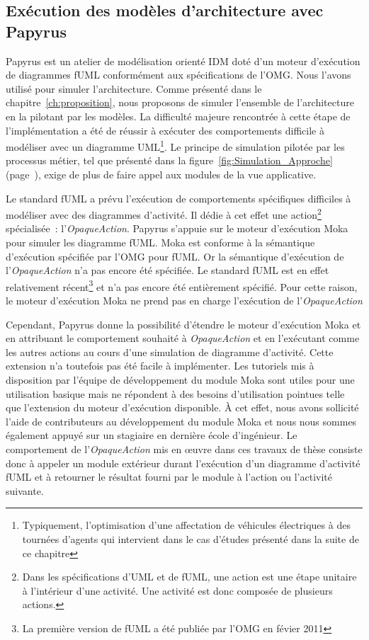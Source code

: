     \subsection{Exécution des modèles d’architecture avec Papyrus}
    \label{sec:opaque_action_papyrus}

    Papyrus est un atelier de modélisation orienté IDM doté d'un moteur
    d'exécution de diagrammes fUML conformément aux spécifications de l'OMG.
    Nous l'avons utilisé pour simuler l'architecture. Comme présenté dans le
    chapitre~\ref{ch:proposition}, nous proposons de simuler l'ensemble de
    l'architecture en la pilotant par les modèles.  La difficulté majeure
    rencontrée à cette étape de l'implémentation a été de réussir à exécuter des
    comportements difficile à modéliser avec un diagramme
    UML\footnote{Typiquement, l'optimisation d'une affectation de véhicules
    électriques à des tournées d'agents qui intervient dans le cas d'études
    présenté dans la suite de ce chapitre}. Le principe de simulation pilotée
    par les processus métier, tel que présenté dans la
    figure~\ref{fig:Simulation_Approche}
    (page~\pageref{fig:Simulation_Approche}), exige de plus de faire appel aux
    modules de la vue applicative.
    
    Le standard fUML a prévu l'exécution de comportements spécifiques difficiles
    à modéliser avec  des diagrammes d'activité. Il dédie à cet effet une
    action\footnote{Dans les spécifications d'UML et de fUML, une action est une étape
    unitaire à l'intérieur d'une activité. Une activité est donc composée de
    plusieurs actions.} spécialisée~: l'\emph{OpaqueAction}. Papyrus s'appuie
    sur le moteur d'exécution Moka pour simuler les diagramme fUML. Moka est
    conforme à la sémantique d'exécution spécifiée par l'OMG pour fUML. Or la
    sémantique d'exécution de l'\emph{OpaqueAction} n'a pas encore été
    spécifiée. Le standard fUML est en effet relativement récent\footnote{La
    première version de fUML a été publiée par l'OMG en févier 2011} et n'a pas
    encore été entièrement spécifié. Pour cette raison, le moteur d'exécution
    Moka ne prend pas en charge l'exécution de l'\emph{OpaqueAction}

    Cependant, Papyrus donne la possibilité d'étendre le moteur d'exécution Moka
    et en attribuant le comportement souhaité à \emph{OpaqueAction} et en
    l'exécutant comme les autres actions au cours d'une simulation de diagramme
    d'activité. Cette extension n'a toutefois pas été facile à implémenter. Les
    tutoriels mis à disposition par l'équipe de développement du module Moka
    sont utiles pour une utilisation basique mais ne répondent à des besoins
    d'utilisation pointues telle que l'extension du moteur d'exécution
    disponible. À cet effet, nous avons sollicité l'aide de contributeurs au
    développement du module Moka et nous nous sommes également appuyé sur un
    stagiaire en dernière école d'ingénieur. Le comportement de
    l'\emph{OpaqueAction} mis en œuvre dans ces travaux de thèse consiste donc à
    appeler un module extérieur durant l'exécution d'un diagramme d'activité
    fUML et à retourner le résultat fourni par le module à l'action ou
    l'activité suivante.

